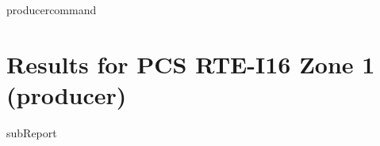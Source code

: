 {{ producercommand }}



    \section{Results for PCS RTE-I16 Zone 1 ({{producer}})}

    {{subReport}}
    \newpage

